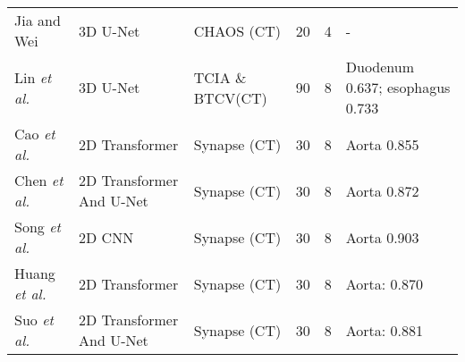 \documentclass[lettersize,journal]{IEEEtran}
\begin{document}
{\begin{table*}[ht!]
{\begin{tabular}{@{}lllllm{}@{}}
Jia and Wei \cite{69}        & 3D U-Net                 & CHAOS (CT) \cite{32}                          & 20                        & 4                           & -                                                                                                                                                                                  \\
Lin {\it{et al.}} \cite{70}         & 3D U-Net                 & TCIA \cite{56,57} \& BTCV(CT) \cite{29} & 90                        & 8                           & Duodenum 0.637; esophagus 0.733                                                                                                                                                    \\
Cao {\it{et al.}} \cite{71}         & 2D Transformer           & Synapse (CT) \cite{2}                         & 30                        & 8                           & Aorta 0.855                                                                                                                                                                        \\
Chen {\it{et al.}} \cite{72}        & 2D Transformer And U-Net & Synapse (CT) \cite{2}                         & 30                        & 8                           & Aorta 0.872                                                                                                                                                                        \\
Song {\it{et al.}} \cite{73}        & 2D CNN                   & Synapse (CT) \cite{2}                         & 30                        & 8                           & Aorta 0.903                                                                                                                                                                        \\
Huang {\it{et al.}} \cite{75}       & 2D Transformer           & Synapse (CT) \cite{2}                         & 30                        & 8                           & Aorta: 0.870                                                                                                                                                                       \\
Suo {\it{et al.}} \cite{76}         & 2D Transformer And U-Net & Synapse (CT) \cite{2}                         & 30                        & 8                           & Aorta: 0.881                                                                                                                                                                       \\

\end{tabular}}
\end{table*}}
\end{document}
